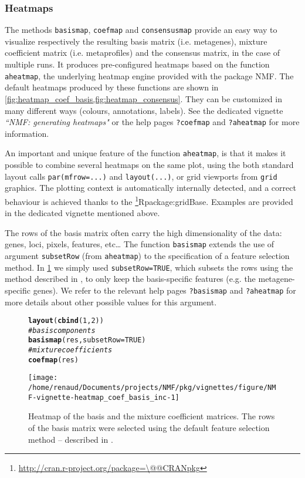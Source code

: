 \documentclass[a4paper]{article}\usepackage[]{graphicx}\usepackage[]{color}
\makeatletter
\def\maxwidth{ %
  \ifdim\Gin@nat@width>\linewidth
    \linewidth
  \else
    \Gin@nat@width
  \fi
}
\newcommand{\hlnum}[1]{\textcolor[rgb]{0.686,0.059,0.569}{#1}}%
\newcommand{\hlcom}[1]{\textcolor[rgb]{0.678,0.584,0.686}{\textit{#1}}}%
\newcommand{\hlstd}[1]{\textcolor[rgb]{0.345,0.345,0.345}{#1}}%
\newcommand{\hlkwc}[1]{\textcolor[rgb]{0.333,0.667,0.333}{#1}}%
\newcommand{\hlkwd}[1]{\textcolor[rgb]{0.737,0.353,0.396}{\textbf{#1}}}%
\newenvironment{kframe}{%
 \def\at@end@of@kframe{}%
 \ifinner\ifhmode%
  \def\at@end@of@kframe{\end{minipage}}%
  \begin{minipage}{\columnwidth}%
 \fi\fi%
 \def\FrameCommand##1{\hskip\@totalleftmargin \hskip-\fboxsep
 \colorbox{shadecolor}{##1}\hskip-\fboxsep
     \hskip-\linewidth \hskip-\@totalleftmargin \hskip\columnwidth}%
 \MakeFramed {\advance\hsize-\width
   \@totalleftmargin\z@ \linewidth\hsize
   \@setminipage}}%
 {\par\unskip\endMakeFramed%
 \at@end@of@kframe}
\newenvironment{knitrout}{}{} %
\let\code=\texttt
\newcommand{\pkgname}[1]{\textit{#1}\xspace}
\newcommand{\CRANurl}[1]{\url{http://cran.r-project.org/package=#1}}
\def\CRANpkg{\@ifstar\@CRANpkg\@@CRANpkg}
\def\@CRANpkg#1{\href{http://cran.r-project.org/package=#1}{\pkgname{#1}}\footnote{\CRANurl{#1}}}
\def\@@CRANpkg#1{\href{http://cran.r-project.org/package=#1}{\pkgname{#1}} package\footnote{\CRANurl{#1}}}
\def\citeCRANpkg{\@ifstar\@citeCRANpkg\@@citeCRANpkg}
\def\@citeCRANpkg#1{\CRANpkg{#1}\cite*{Rpackage:#1}}
\def\@@citeCRANpkg#1{\CRANpkg{#1}~\cite{Rpackage:#1}}
\renewcommand{\cite}[1]{\parencite{#1}}
\makeatother
\begin{document}
\subsubsection*{Heatmaps}

The methods \code{basismap}, \code{coefmap} and \code{consensusmap} provide an
easy way to visualize respectively the resulting basis matrix (i.e. metagenes),
mixture coefficient matrix (i.e. metaprofiles) and the consensus matrix, in the
case of multiple runs.
It produces pre-configured heatmaps based on the function \code{aheatmap}, the
underlying heatmap engine provided with the package NMF. 
The default heatmaps produced by these functions are shown in
\cref{fig:heatmap_coef_basis,fig:heatmap_consensus}.
They can be customized in many different ways (colours, annotations, labels).
See the dedicated vignette \emph{``NMF: generating heatmaps"} or the help pages
\code{?coefmap} and \code{?aheatmap} for more information.

An important and unique feature of the function \code{aheatmap}, is that it
makes it possible to combine several heatmaps on the same plot, using the both
standard layout calls \texttt{par(mfrow=...)} and \texttt{layout(...)}, or grid
viewports from \texttt{grid} graphics.
The plotting context is automatically internally detected, and a correct
behaviour is achieved thanks to the \citeCRANpkg{gridBase}.
Examples are provided in the dedicated vignette mentioned above.

The rows of the basis matrix often carry the high dimensionality of the data: genes, loci, pixels, features, etc\ldots 
The function \code{basismap} extends the use of argument \code{subsetRow} (from \code{aheatmap}) to the specification of a feature selection method.
In \cref{fig:heatmap_coef_basis} we simply used \code{subsetRow=TRUE}, which subsets the rows using the method described in \cite{KimH2007}, to only keep the basis-specific features (e.g. the metagene-specific genes). 
We refer to the relevant help pages \code{?basismap} and \code{?aheatmap} for more details about other possible values for this argument.

\begin{figure}[!htbp]
\centering
\begin{knitrout}
\color{fgcolor}\begin{kframe}
\begin{alltt}
\hlkwd{layout}\hlstd{(}\hlkwd{cbind}\hlstd{(}\hlnum{1}\hlstd{,}\hlnum{2}\hlstd{))}
\hlcom{# basis components}
\hlkwd{basismap}\hlstd{(res,} \hlkwc{subsetRow}\hlstd{=}\hlnum{TRUE}\hlstd{)}
\hlcom{# mixture coefficients}
\hlkwd{coefmap}\hlstd{(res)}
\end{alltt}
\end{kframe}
\texttt{[image: /home/renaud/Documents/projects/NMF/pkg/vignettes/figure/NMF-vignette-heatmap\_coef\_basis\_inc-1]} 

\end{knitrout}
\caption{Heatmap of the basis and the mixture coefficient matrices. The rows of the basis matrix were selected using the default feature selection method -- described in \cite{KimH2007}.}
\label{fig:heatmap_coef_basis}
\end{figure}
\end{document}
